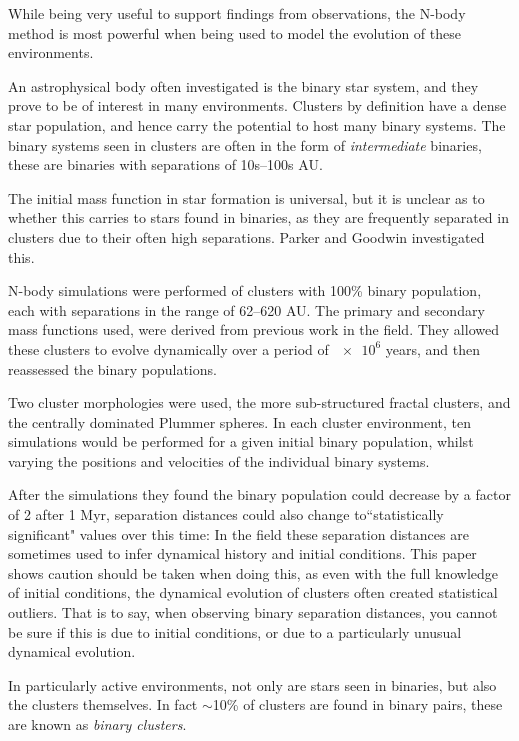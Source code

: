 \documentclass[a4paper,10pt]{article}
\begin{document}
While being very useful to support findings from observations, the N-body method is most powerful when being used to model the evolution of these environments. 

An astrophysical body often investigated is the binary star system, and they prove to be of interest in many environments. Clusters by definition have a dense star population, and hence carry the potential to host many binary systems. The binary systems seen in clusters are often in the form of \textit{intermediate} binaries, these are binaries with separations of 10s--100s AU. 

The initial mass function in star formation is universal, but it is unclear as to whether this carries to stars found in binaries, as they are frequently separated in clusters due to their often high separations. Parker and Goodwin investigated this\cite{Binaries}.

N-body simulations were performed of clusters with 100\% binary population, each with separations in the range of 62--620 AU. The primary and secondary mass functions used, were derived from previous work in the field. They allowed these clusters to evolve dynamically over a period of $\num{e6}$ years, and then reassessed the binary populations. 

Two cluster morphologies were used, the more sub-structured fractal clusters, and the centrally dominated Plummer spheres. In each cluster environment, ten simulations would be performed for a given initial binary population, whilst varying the positions and velocities of the individual binary systems. 

After the simulations they found the binary population could decrease by a factor of 2 after 1 Myr, separation distances could also change to``statistically significant" values over this time: In the field these separation distances are sometimes used to infer dynamical history and initial conditions. This paper shows caution should be taken when doing this, as even with the full knowledge of initial conditions, the dynamical evolution of clusters often created statistical outliers. That is to say, when observing binary separation distances, you cannot be sure if this is due to initial conditions, or due to a particularly unusual dynamical evolution.

In particularly active environments, not only are stars seen in binaries, but also the clusters themselves. In fact $\sim$10\% of clusters are found in binary pairs, these are known as \textit{binary clusters}. 
\end{document}
